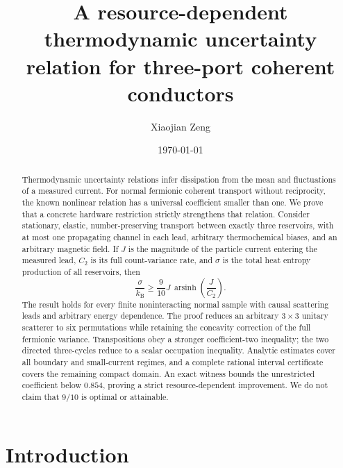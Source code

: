 \documentclass[aps,pra,reprint,superscriptaddress,nofootinbib,longbibliography,floatfix]{revtex4-2}
\newcommand{\kb}{k_{\mathrm B}}
\newcommand{\asinh}{\operatorname{arsinh}}
\begin{document}
\title{A resource-dependent thermodynamic uncertainty relation for three-port coherent conductors}

\author{Xiaojian Zeng}

\date{\today}

\begin{abstract}
Thermodynamic uncertainty relations infer dissipation from the mean and fluctuations of a measured current.  For normal fermionic coherent transport without reciprocity, the known nonlinear relation has a universal coefficient smaller than one.  We prove that a concrete hardware restriction strictly strengthens that relation.  Consider stationary, elastic, number-preserving transport between exactly three reservoirs, with at most one propagating channel in each lead, arbitrary thermochemical biases, and an arbitrary magnetic field.  If $J$ is the magnitude of the particle current entering the measured lead, $C_2$ is its full count-variance rate, and $\sigma$ is the total heat entropy production of all reservoirs, then
\begin{equation*}
 \frac{\sigma}{\kb}\geq \frac{9}{10}J\,\asinh\!\left(\frac{J}{C_2}\right).
\end{equation*}
The result holds for every finite noninteracting normal sample with causal scattering leads and arbitrary energy dependence.  The proof reduces an arbitrary $3\times3$ unitary scatterer to six permutations while retaining the concavity correction of the full fermionic variance.  Transpositions obey a stronger coefficient-two inequality; the two directed three-cycles reduce to a scalar occupation inequality.  Analytic estimates cover all boundary and small-current regimes, and a complete rational interval certificate covers the remaining compact domain.  An exact witness bounds the unrestricted coefficient below $0.854$, proving a strict resource-dependent improvement.  We do not claim that $9/10$ is optimal or attainable.
\end{abstract}

\maketitle

\section{Introduction}
\end{document}
